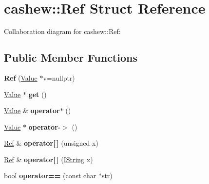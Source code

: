 \hypertarget{structcashew_1_1_ref}{}\section{cashew\+:\+:Ref Struct Reference}
\label{structcashew_1_1_ref}


Collaboration diagram for cashew\+:\+:Ref\+:
\subsection*{Public Member Functions}
\begin{DoxyCompactItemize}
\item 
\mbox{\label{structcashew_1_1_ref_a46890646f32f21f16a38dd36a5cf8ece}} 
{\bfseries Ref} (\mbox{\hyperlink{structcashew_1_1_value}{Value}} $\ast$v=nullptr)
\item 
\mbox{\label{structcashew_1_1_ref_a5b58626059ba5ce94a789c8c2819ea6a}} 
\mbox{\hyperlink{structcashew_1_1_value}{Value}} $\ast$ {\bfseries get} ()
\item 
\mbox{\label{structcashew_1_1_ref_a0a83ec46c5789fa5040ea8037a4c98ff}} 
\mbox{\hyperlink{structcashew_1_1_value}{Value}} \& {\bfseries operator$\ast$} ()
\item 
\mbox{\label{structcashew_1_1_ref_aa1811fde09dbc09a606123459d78e2d6}} 
\mbox{\hyperlink{structcashew_1_1_value}{Value}} $\ast$ {\bfseries operator-\/$>$} ()
\item 
\mbox{\label{structcashew_1_1_ref_a97e2231a508f77794b3959fda9068a31}} 
\mbox{\hyperlink{structcashew_1_1_ref}{Ref}} \& {\bfseries operator\mbox{[}$\,$\mbox{]}} (unsigned x)
\item 
\mbox{\label{structcashew_1_1_ref_a5b3cc8d6b7e95c5fdfd4f409b5aaa5d6}} 
\mbox{\hyperlink{structcashew_1_1_ref}{Ref}} \& {\bfseries operator\mbox{[}$\,$\mbox{]}} (\mbox{\hyperlink{structcashew_1_1_i_string}{I\+String}} x)
\item 
\mbox{\label{structcashew_1_1_ref_a4d5a840e0623ff550000e3712049a971}} 
bool {\bfseries operator==} (const char $\ast$str)
\item 

\end{DoxyCompactItemize}
